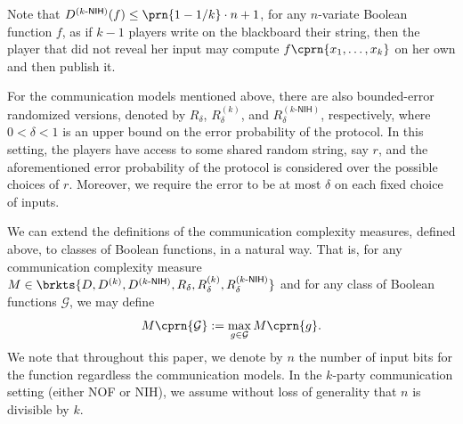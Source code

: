     Note that $D^{(k\text{-}\mathsf{NIH})}(f)\leq\prn{1-1/k}\cdot n+1$, for any $n$-variate Boolean function $f$, as if $k-1$ players write on the blackboard their string, then the player that did not reveal her input may compute $f\cprn{x_1,\dots,x_k}$ on her own and then publish it.
    
    For the communication models mentioned above, there are also bounded-error randomized versions, denoted by $R_\delta$, $R_\delta^{(k)}$, and $R^{(k\text{-}\mathsf{NIH})}_\delta$, respectively, where $0<\delta<1$ is an upper bound on the error probability of the protocol. In this setting, the players have access to some shared random string, say $r$, and the aforementioned error probability of the protocol is considered over the possible choices of $r$. Moreover, we require the error to be at most $\delta$ on each fixed choice of inputs.
    
    We can extend the definitions of the communication complexity measures, defined above, to classes of Boolean functions, in a natural way. That is, for any communication complexity measure $M\in\brkts{D,D^{(k)},D^{(k\text{-}\mathsf{NIH})},R_\delta,R_\delta^{(k)},R_\delta^{(k\text{-}\mathsf{NIH})}}$ and for any class of Boolean functions $\mathcal{G}$, we may define
    \[
        M\cprn{\mathcal{G}}:=\max_{g\in\mathcal{G}}M\cprn{g}.
    \]
	We note that throughout this paper, we denote by $n$ the number of input bits for the function regardless the communication models. In the $k$-party communication setting (either NOF or NIH), we assume without loss of generality that $n$ is divisible by $k$.
	
